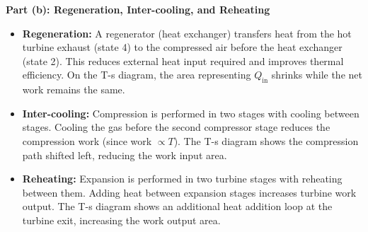 \documentclass[12pt,a3paper]{article}
\begin{document}
\begin{enumerate}
\begin{tcolorbox}[enhanced,breakable,ansbox,colback=cB!4,colframe=cB,
  boxrule=0.8pt,arc=5pt,
  title={\textbf{Answer}},fonttitle=\bfseries\color{white},colbacktitle=cB]
\begin{center}
\end{center}

\hrulefill

\textbf{Part (b): Regeneration, Inter-cooling, and Reheating}

\begin{itemize}[leftmargin=1.5em,itemsep=5pt]
  \item \textbf{Regeneration:} A regenerator (heat exchanger) transfers heat
        from the hot turbine exhaust (state 4) to the compressed air before
        the heat exchanger (state 2). This reduces external heat input required
        and improves thermal efficiency. On the T-s diagram, the area
        representing $Q_{\text{in}}$ shrinks while the net work remains the
        same.
  \item \textbf{Inter-cooling:} Compression is performed in two stages with
        cooling between stages. Cooling the gas before the second compressor
        stage reduces the compression work (since work $\propto T$). The T-s
        diagram shows the compression path shifted left, reducing the work
        input area.
  \item \textbf{Reheating:} Expansion is performed in two turbine stages with
        reheating between them. Adding heat between expansion stages increases
        turbine work output. The T-s diagram shows an additional heat
        addition loop at the turbine exit, increasing the work output area.
\end{itemize}


\end{tcolorbox}
\end{enumerate}
\end{document}
